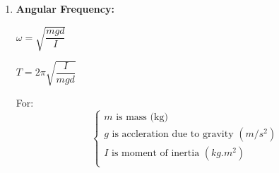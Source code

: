 \documentclass[10pt]{article}
\begin{document}
\begin{enumerate}
	\item \textbf{Angular Frequency: } \\
	\begin{mybox}
		\begin{center}
			$\omega = \sqrt{\dfrac{mgd}{I}}$
		\end{center}
	\end{mybox}
	\bigbreak

	\begin{mybox}
		\begin{center}
			$T = 2 \pi \sqrt{\dfrac{I}{mgd}}$
		\end{center}
	\end{mybox}
	For: \\
	$$
	\begin{cases}
		m \mbox{ is mass (kg)} \\
		g \mbox{ is accleration due to gravity } (m/s^2) \\
		I \mbox{ is moment of inertia } (kg.m^2) \\
	\end{cases}
	$$
\end{enumerate}
\end{document}
